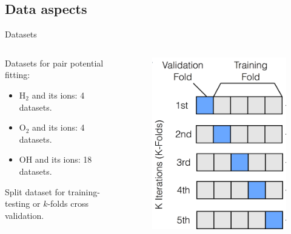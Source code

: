 \documentclass{beamer}
\begin{document}
\subsection{Data aspects}
\begin{frame}{Datasets}
    \begin{columns}
        \begin{column}{0.5\textwidth}
            Datasets for pair potential fitting:
            \begin{itemize}
                \item H$_2$ and its ions: 4 datasets.
                \item O$_2$ and its ions: 4 datasets.
                \item OH and its ions: 18 datasets.
            \end{itemize}
            
            Split dataset for training-testing or $k$-folds cross validation.
        \end{column}
        \begin{column}{0.5\textwidth}
            \begin{figure}[h]
                \centering
                \includegraphics[scale=0.27]{img/slide/kfold.png}
                \label{fig:kfold}
            \end{figure}
        \end{column}
    \end{columns}
    
    
    
\end{frame}
\end{document}
